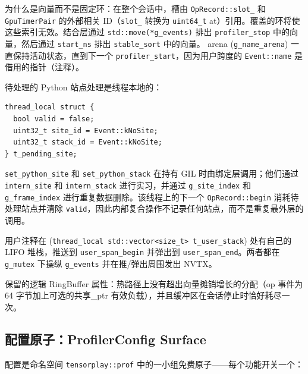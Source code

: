 为什么是向量而不是固定环：在整个会话中，槽由 \texttt{OpRecord::slot\_} 和 \texttt{GpuTimerPair} 的外部相关 ID（\texttt{slot\_} 转换为 \texttt{uint64\_t} at）引用。覆盖的环将使这些索引无效。结合层通过 \texttt{std::move(*g\_events)} 排出 \texttt{profiler\_stop} 中的向量，然后通过 \texttt{start\_ns} 排出 \texttt{stable\_sort} 中的向量。 arena (\texttt{g\_name\_arena}) 一直保持活动状态，直到下一个 \texttt{profiler\_start}，因为用户跨度的 \texttt{Event::name} 是借用的指针（注释）。

待处理的 Python 站点处理是线程本地的：

\begin{lstlisting}[caption={per-thread pending site.}, label=lst:pendingsite, style=cppstyle]
thread_local struct {
  bool valid = false;
  uint32_t site_id = Event::kNoSite;
  uint32_t stack_id = Event::kNoSite;
} t_pending_site;
\end{lstlisting}

\texttt{set\_python\_site} 和 \texttt{set\_python\_stack} 在持有 GIL 时由绑定层调用；他们通过 \texttt{intern\_site} 和 \texttt{intern\_stack} 进行实习，并通过 \texttt{g\_site\_index} 和 \texttt{g\_frame\_index} 进行重复数据删除。该线程上的下一个 \texttt{OpRecord::begin} 消耗待处理站点并清除 \texttt{valid}，因此内部复合操作不记录任何站点，而不是重复最外层的调用。

用户注释在 (\texttt{thread\_local std::vector<size\_t> t\_user\_stack}) 处有自己的 LIFO 堆栈，推送到 \texttt{user\_span\_begin} 并弹出到 \texttt{user\_span\_end}。两者都在 \texttt{g\_mutex} 下操纵 \texttt{g\_events} 并在推/弹出周围发出 NVTX。

保留的逻辑 RingBuffer 属性：热路径上没有超出向量摊销增长的分配（op 事件为 64 字节加上可选的共享\_ptr 有效负载），并且缓冲区在会话停止时恰好耗尽一次。

\subsection{配置原子：ProfilerConfig Surface}

配置是命名空间 \texttt{tensorplay::prof} 中的一小组免费原子——每个功能开关一个：

